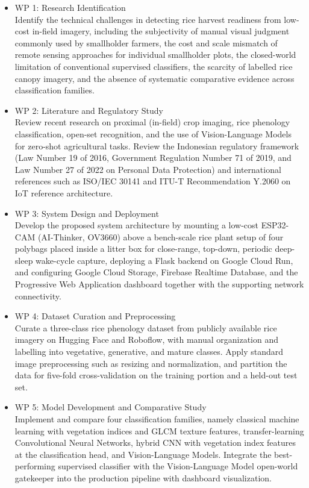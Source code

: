 \begin{itemize}

    \item WP 1: Research Identification \\
    Identify the technical challenges in detecting rice harvest readiness from low-cost in-field imagery, including the subjectivity of manual visual judgment commonly used by smallholder farmers, the cost and scale mismatch of remote sensing approaches for individual smallholder plots, the closed-world limitation of conventional supervised classifiers, the scarcity of labelled rice canopy imagery, and the absence of systematic comparative evidence across classification families.

    \item WP 2: Literature and Regulatory Study \\
    Review recent research on proximal (in-field) crop imaging, rice phenology classification, open-set recognition, and the use of Vision-Language Models for zero-shot agricultural tasks. Review the Indonesian regulatory framework (Law Number 19 of 2016, Government Regulation Number 71 of 2019, and Law Number 27 of 2022 on Personal Data Protection) and international references such as ISO/IEC 30141 and ITU-T Recommendation Y.2060 on IoT reference architecture.

    \item WP 3: System Design and Deployment \\
    Develop the proposed system architecture by mounting a low-cost ESP32-CAM (AI-Thinker, OV3660) above a bench-scale rice plant setup of four polybags placed inside a litter box for close-range, top-down, periodic deep-sleep wake-cycle capture, deploying a Flask backend on Google Cloud Run, and configuring Google Cloud Storage, Firebase Realtime Database, and the Progressive Web Application dashboard together with the supporting network connectivity.

    \item WP 4: Dataset Curation and Preprocessing \\
    Curate a three-class rice phenology dataset from publicly available rice imagery on Hugging Face and Roboflow, with manual organization and labelling into vegetative, generative, and mature classes. Apply standard image preprocessing such as resizing and normalization, and partition the data for five-fold cross-validation on the training portion and a held-out test set.

    \item WP 5: Model Development and Comparative Study \\
    Implement and compare four classification families, namely classical machine learning with vegetation indices and GLCM texture features, transfer-learning Convolutional Neural Networks, hybrid CNN with vegetation index features at the classification head, and Vision-Language Models. Integrate the best-performing supervised classifier with the Vision-Language Model open-world gatekeeper into the production pipeline with dashboard visualization.


\end{itemize}
